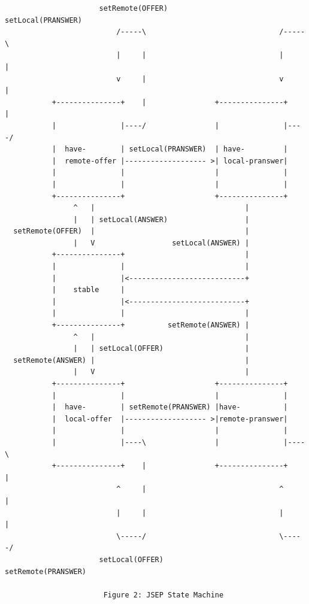 \documentclass{article}
\begin{document}
\begin{verbatim}
                      setRemote(OFFER)               setLocal(PRANSWER)
                          /-----\                               /-----\
                          |     |                               |     |
                          v     |                               v     |
           +---------------+    |                +---------------+    |
           |               |----/                |               |----/
           |  have-        | setLocal(PRANSWER)  | have-         |
           |  remote-offer |------------------- >| local-pranswer|
           |               |                     |               |
           |               |                     |               |
           +---------------+                     +---------------+
                ^   |                                   |
                |   | setLocal(ANSWER)                  |
  setRemote(OFFER)  |                                   |
                |   V                  setLocal(ANSWER) |
           +---------------+                            |
           |               |                            |
           |               |<---------------------------+
           |    stable     |
           |               |<---------------------------+
           |               |                            |
           +---------------+          setRemote(ANSWER) |
                ^   |                                   |
                |   | setLocal(OFFER)                   |
  setRemote(ANSWER) |                                   |
                |   V                                   |
           +---------------+                     +---------------+
           |               |                     |               |
           |  have-        | setRemote(PRANSWER) |have-          |
           |  local-offer  |------------------- >|remote-pranswer|
           |               |                     |               |
           |               |----\                |               |----\
           +---------------+    |                +---------------+    |
                          ^     |                               ^     |
                          |     |                               |     |
                          \-----/                               \-----/
                      setLocal(OFFER)               setRemote(PRANSWER)

                       Figure 2: JSEP State Machine
\end{verbatim}
\end{document}
